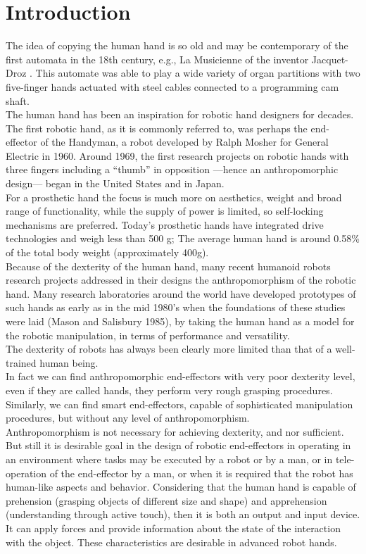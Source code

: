 \documentclass[a4paper, 10pt, conference]{ieeeconf}      %
\begin{document}
\section{\textbf{Introduction}}
The idea of copying the human hand is so old and may be contemporary of the first automata in the 18th century, e.g., La Musicienne of the inventor Jacquet-Droz \cite{birglen2007underactuated}. This automate was able to play a wide variety of organ partitions with two five-finger hands actuated with steel cables connected to a programming cam shaft.\\
The human hand has been an inspiration for robotic hand designers for decades. The first robotic hand, as it is commonly referred to, was perhaps the end-effector of the Handyman, a robot developed by Ralph Mosher for General Electric in 1960. Around 1969, the first research projects on robotic hands with three fingers including a “thumb” in opposition —hence an anthropomorphic design— began in the United States and in Japan.\\
For a prosthetic hand the focus is much more on aesthetics, weight and broad range of functionality, while the supply of power is limited, so self-locking mechanisms are preferred. Today's prosthetic hands have integrated drive technologies and weigh less than 500 g; The average human hand is around 0.58\% of the total body weight (approximately 400g).\\
Because of the dexterity of the human hand, many recent humanoid robots research projects addressed in their designs the anthropomorphism of the robotic hand. Many research laboratories around the world have developed prototypes of such hands as early as in the mid 1980’s when the foundations of these studies were laid (Mason and Salisbury 1985), by taking the human hand as a model for the robotic manipulation, in terms of performance and versatility.\\
The dexterity of robots has always been clearly more limited than that of a well-trained human being.\\
In fact we can find anthropomorphic end-effectors with very poor dexterity level, even if they are called hands, they perform very rough grasping procedures. Similarly, we can find smart end-effectors, capable of sophisticated manipulation procedures, but without any level of anthropomorphism.\\
Anthropomorphism is not necessary for achieving dexterity, and nor sufficient. But still it is desirable goal in the design of robotic end-effectors in operating in an environment where tasks may be executed by a robot or by a man, or in tele-operation of the end-effector by a man, or when it is required that the robot has human-like aspects and behavior. Considering that the human hand is capable of prehension (grasping objects of different size and shape) and apprehension (understanding through active touch), then it is both an output and input device. It can apply forces and provide information about the state of the interaction with the object. These characteristics are desirable in advanced robot hands.\\
\end{document}
